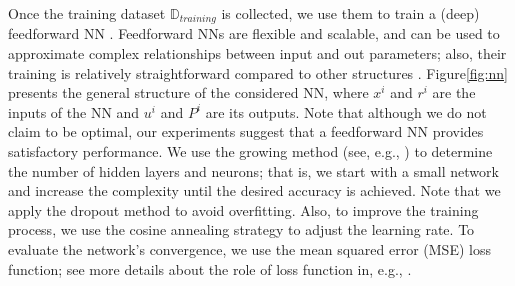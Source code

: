 \documentclass[1p,times]{elsarticle}
\begin{document}

 

Once the training dataset $\mathbb{D}_{training}$ is collected, we use them to train a (deep) feedforward NN \cite{Fine1999}. {{\color{blue}}Feedforward NNs are flexible and scalable, and can be used to approximate complex relationships between input and out parameters; also, their training is relatively straightforward compared to other structures \cite{Goodfellow2016}}. Figure\ref{fig:nn} presents the general structure of the considered NN, where $x^i$ and $r^i$ are the inputs of the NN and $u^i$ and $P^i$ are its outputs. {{\color{blue}}Note that although we do not claim to be optimal, our experiments suggest that a feedforward NN provides satisfactory performance.}  {{\color{blue}}We use the growing method (see, e.g., \cite{Evci2022,Wu2020,Bengio2005}) to determine the number of hidden layers and neurons; that is, we start with a small network and increase the complexity until the desired accuracy is achieved.} Note that we apply the dropout method \cite{srivastava2014dropout,lim2021study,sanjar2020weight,wu2015towards} to avoid overfitting. Also, to improve the training process, we use the cosine annealing strategy \cite{liu2022super,eshraghian2022navigating} to adjust the learning rate.  {{\color{blue}}To evaluate the network's convergence, we use the mean squared error (MSE) loss function; see more details about the role of loss function in, e.g., \cite{Goodfellow2016}.}


\end{document}
